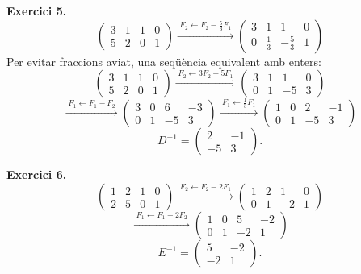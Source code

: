 \documentclass[12pt,a4paper]{article}
\newcommand{\blocInici}{%
  \par\nobreak\vspace{0pt}%
  \begin{minipage}[t]{\linewidth}%
}
\newcommand{\blocFi}{%
  \end{minipage}%
  \par
}
\newcommand{\gaussFletxa}[1]{%
  \mathrel{\xrightarrow{\;\scriptstyle #1\;}}%
}
\begin{document}
\vspace{0.5em}

%
\blocInici
\noindent\textbf{Exercici 5.}
{\setlength{\arraycolsep}{2.5pt}%
\[
  \left(\begin{array}{cc|cc} 3 & 1 & 1 & 0 \\ 5 & 2 & 0 & 1 \end{array}\right)
  \gaussFletxa{F_2 \leftarrow F_2 - \tfrac{5}{3}F_1}
  \left(\begin{array}{cc|cc} 3 & 1 & 1 & 0 \\ 0 & \tfrac{1}{3} & -\tfrac{5}{3} & 1 \end{array}\right)
\]
Per evitar fraccions aviat, una seqüència equivalent amb enters:
\[
  \left(\begin{array}{cc|cc} 3 & 1 & 1 & 0 \\ 5 & 2 & 0 & 1 \end{array}\right)
  \gaussFletxa{F_2 \leftarrow 3F_2 - 5F_1}
  \left(\begin{array}{cc|cc} 3 & 1 & 1 & 0 \\ 0 & 1 & -5 & 3 \end{array}\right)
\]
\[
  \gaussFletxa{F_1 \leftarrow F_1 - F_2}
  \left(\begin{array}{cc|cc} 3 & 0 & 6 & -3 \\ 0 & 1 & -5 & 3 \end{array}\right)
  \gaussFletxa{F_1 \leftarrow \tfrac{1}{3}F_1}
  \left(\begin{array}{cc|cc} 1 & 0 & 2 & -1 \\ 0 & 1 & -5 & 3 \end{array}\right)
\]
}
\[
  D^{-1} = \begin{pmatrix} 2 & -1 \\ -5 & 3 \end{pmatrix}.
\]
\blocFi

\vspace{0.5em}

%
\blocInici
\noindent\textbf{Exercici 6.}
{\setlength{\arraycolsep}{2.5pt}%
\[
  \left(\begin{array}{cc|cc} 1 & 2 & 1 & 0 \\ 2 & 5 & 0 & 1 \end{array}\right)
  \gaussFletxa{F_2 \leftarrow F_2 - 2F_1}
  \left(\begin{array}{cc|cc} 1 & 2 & 1 & 0 \\ 0 & 1 & -2 & 1 \end{array}\right)
\]
\[
  \gaussFletxa{F_1 \leftarrow F_1 - 2F_2}
  \left(\begin{array}{cc|cc} 1 & 0 & 5 & -2 \\ 0 & 1 & -2 & 1 \end{array}\right)
\]
}
\[
  E^{-1} = \begin{pmatrix} 5 & -2 \\ -2 & 1 \end{pmatrix}.
\]
\blocFi
\end{document}
